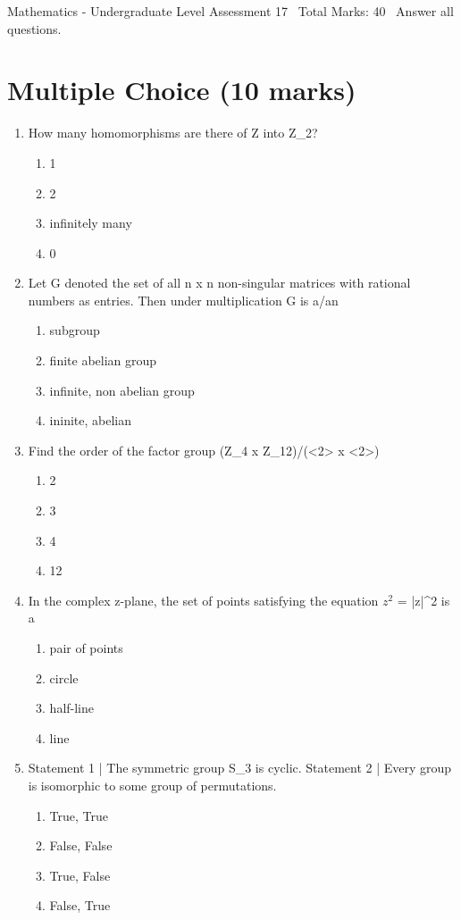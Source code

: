 \documentclass[12pt]{article}
\begin{document}
\begin{center}
Mathematics - Undergraduate Level Assessment 17 \
Total Marks: 40 \
Answer all questions.
\end{center}

\section*{Multiple Choice (10 marks)}
\begin{enumerate}[label=\arabic*.]
\item How many homomorphisms are there of Z into Z\_2?
\begin{enumerate}[label=(\alph*)]
    \item 1
    \item 2
    \item infinitely many
    \item 0
\end{enumerate}
\item Let G denoted the set of all n x n non-singular matrices with rational numbers as entries. Then under multiplication G is a/an
\begin{enumerate}[label=(\alph*)]
    \item subgroup
    \item finite abelian group
    \item infinite, non abelian group
    \item ininite, abelian
\end{enumerate}
\item Find the order of the factor group (Z\_4 x Z\_12)/(\textless{}2\textgreater{} x \textless{}2\textgreater{})
\begin{enumerate}[label=(\alph*)]
    \item 2
    \item 3
    \item 4
    \item 12
\end{enumerate}
\item In the complex z-plane, the set of points satisfying the equation $z^2$ = |z|^2 is a
\begin{enumerate}[label=(\alph*)]
    \item pair of points
    \item circle
    \item half-line
    \item line
\end{enumerate}
\item Statement 1 | The symmetric group S\_3 is cyclic. Statement 2 | Every group is isomorphic to some group of permutations.
\begin{enumerate}[label=(\alph*)]
    \item True, True
    \item False, False
    \item True, False
    \item False, True
\end{enumerate}
\end{enumerate}
\end{document}
